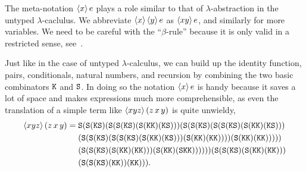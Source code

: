 The meta-notation $\langle x \rangle\,e$ plays a role similar to that of
$\lambda$-abstraction in the untyped $\lambda$-caclulus. We abbreviate
$\langle x \rangle\,\langle y \rangle\,e$ as $\langle x y \rangle\,e$, and similarly for
more variables. We need to be careful with the ``$\beta$-rule''
because it is only valid in a restricted sense,
see~\cite{LongleyJ:reatls}.

Just like in the case of untyped $\lambda$-calculus, we can build up
the identity function, pairs, conditionals, natural numbers, and
recursion by combining the two basic combinators $\mathtt{K}$ and
$\mathtt{S}$. In doing so the notation $\langle x \rangle\,e$ is handy because it
saves a lot of space and makes expressions much more comprehensible,
as even the translation of a simple term like $\langle x y z \rangle\,(z\, x\,
  y)$ is quite unwieldy,
%
\begin{equation*}
  \langle x y z \rangle\,(z\, x\, y) =
  \begin{aligned}[t]
  & {\mathtt{S}} (
    {\mathtt{S}} ({\mathtt{K}}{\mathtt{S}}) (
      {\mathtt{S}}({\mathtt{S}}({\mathtt{K}}{\mathtt{S}})({\mathtt{S}}({\mathtt{K}}{\mathtt{K}})({\mathtt{K}}{\mathtt{S}}))) (
        {\mathtt{S}} (
          {\mathtt{S}} ({\mathtt{K}}{\mathtt{S}}) (
            {\mathtt{S}}({\mathtt{S}}({\mathtt{K}}{\mathtt{S}})({\mathtt{S}}({\mathtt{K}}{\mathtt{K}})({\mathtt{K}}{\mathtt{S}}))) \\ & (
              {\mathtt{S}}({\mathtt{S}}({\mathtt{K}}{\mathtt{S}})({\mathtt{S}}({\mathtt{S}}({\mathtt{K}}{\mathtt{S}})({\mathtt{S}}({\mathtt{K}}{\mathtt{K}})({\mathtt{K}}{\mathtt{S}})))({\mathtt{S}}({\mathtt{K}}{\mathtt{K}})({\mathtt{K}}{\mathtt{K}}))))(
              {\mathtt{S}}({\mathtt{K}}{\mathtt{K}})({\mathtt{K}}{\mathtt{K}}))
            )
          )
        ) \\ &
   (
          {\mathtt{S}}({\mathtt{S}}({\mathtt{K}}{\mathtt{S}})({\mathtt{S}}({\mathtt{K}}{\mathtt{K}})({\mathtt{K}}{\mathtt{K}})))({\mathtt{S}}({\mathtt{K}}{\mathtt{K}})({\mathtt{S}}{\mathtt{K}}{\mathtt{K}}))
          )
      )
    )
  ) (
    {\mathtt{S}}({\mathtt{S}}({\mathtt{K}}{\mathtt{S}})({\mathtt{S}}({\mathtt{K}}{\mathtt{K}})({\mathtt{K}}{\mathtt{K}}))) \\ & ({\mathtt{S}}({\mathtt{S}}({\mathtt{K}}{\mathtt{S}})({\mathtt{K}}{\mathtt{K}}))({\mathtt{K}}{\mathtt{K}}))
  ).
  \end{aligned}
\end{equation*}
%

